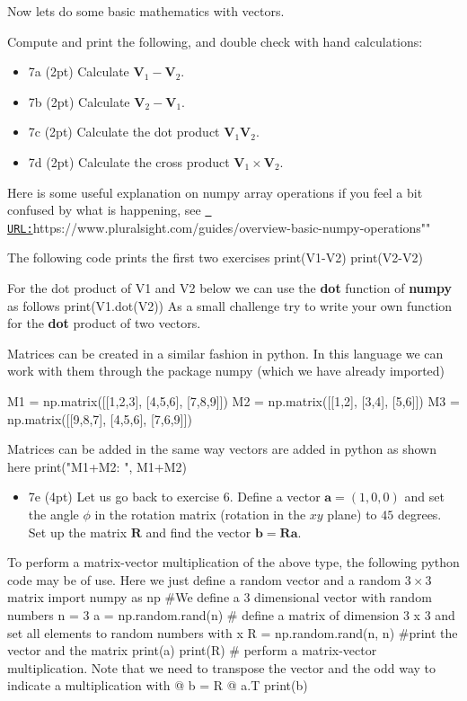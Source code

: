 \documentclass[%
oneside,                 %
final,                   %
10pt]{article}
\begin{document}
Now lets do some basic mathematics with vectors.


Compute and print the following, and double check with hand calculations:

\begin{itemize}
\item 7a (2pt)  Calculate $\bm{V}_1-\bm{V}_2$.

\item 7b (2pt)  Calculate $\bm{V}_2-\bm{V}_1$.

\item 7c (2pt) Calculate the dot product $\bm{V}_1\bm{V}_2$.

\item 7d (2pt) Calculate the cross product $\bm{V}_1\times\bm{V}_2$.
\end{itemize}

\noindent
Here is some useful explanation on numpy array operations if you feel a bit confused by what is happening, see \href{{URL:}}{\nolinkurl{ URL:}}https://www.pluralsight.com/guides/overview-basic-numpy-operations""

The following code prints the first two exercises
\bpycod
print(V1-V2)
print(V2-V2)
\epycod

For the dot product of V1 and V2 below we can use the \textbf{dot} function of \textbf{numpy} as follows
\bpycod
print(V1.dot(V2))
\epycod
As a small challenge try to write your own function for the \textbf{dot} product of two vectors.

Matrices can be created in a similar fashion in python.  In this
language we can work with them through the package numpy (which we
have already imported)


\bpycod
M1 = np.matrix([[1,2,3],
             [4,5,6],
             [7,8,9]])
M2 = np.matrix([[1,2],
             [3,4],
             [5,6]])
M3 = np.matrix([[9,8,7],
             [4,5,6],
             [7,6,9]])
\epycod

Matrices can be added in the same way vectors are added in python as shown here
\bpycod
print("M1+M2: ", M1+M2)
\epycod

\begin{itemize}
\item 7e (4pt) Let us go back to exercise 6. Define a vector $\bm{a}=(1,0,0)$ and set the angle $\phi$ in the rotation matrix (rotation in the $xy$ plane) to $45$ degrees. Set up the matrix $\bm{R}$ and find the vector $\bm{b}=\bm{R}\bm{a}$.
\end{itemize}

\noindent
To perform a matrix-vector multiplication of the above type, the following python code may be of use. Here we just define a random vector and a random $3\times 3$ matrix
\bpycod
import numpy as np
#We define a  3 dimensional vector with random numbers
n = 3
a = np.random.rand(n)
# define a matrix of dimension 3 x 3 and set all elements to random numbers with x \in [0, 1]
R = np.random.rand(n, n)
#print the vector and the matrix
print(a)
print(R)
# perform a matrix-vector multiplication. Note that we need to transpose the vector and the odd way to indicate a multiplication with @
b = R @ a.T
print(b)
\epycod
\end{document}
